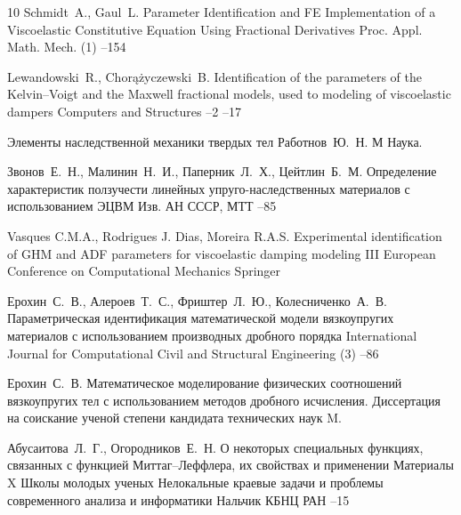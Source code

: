 \begin{thebibliography}{10}
\by Schmidt~A., Gaul~L.
\paper Parameter Identification and FE Implementation of a Viscoelastic Constitutive Equation Using Fractional Derivatives
\jour Proc. Appl. Math. Mech.
(1)
--154

\by Lewandowski~R., \Russian Chor\k{a}\.zyczewski~B.
\paper  Identification of the parameters of the Kelvin--Voigt and the Maxwell fractional models, used to modeling of viscoelastic dampers
\jour Computers and Structures
--2
--17

\book Элементы наследственной механики твердых тел
\by Работнов~Ю.~Н.
\publaddr М
\publ Наука.


\by Звонов~Е.~Н., Малинин~Н.~И., Паперник~Л.~Х., Цейтлин~Б.~М.
\paper Определение характеристик ползучести линейных упруго-наследственных материалов с использованием ЭЦВМ
\jour  Изв. АН СССР, МТТ
–85

\by Vasques C.M.A., Rodrigues J. Dias,  Moreira R.A.S.
\paper Experimental identification of GHM and ADF parameters for viscoelastic damping modeling
\inbook III European Conference on Computational Mechanics
\publ  Springer

\by Ерохин~С.~В., Алероев~Т.~С., Фриштер~Л.~Ю., Колесниченко~А.~В.
\paper Параметрическая идентификация математической модели вязкоупругих
материалов с использованием производных дробного порядка
\jour International Journal for Computational Civil and Structural Engineering
(3)
--86

\by Ерохин~С.~В.
\book Математическое моделирование физических соотношений вязкоупругих тел с использованием методов дробного исчисления. Диссертация на соискание ученой степени кандидата технических наук
\publaddr M.




\by Абусаитова~Л.~Г., Огородников~Е.~Н.
\paper О некоторых специальных функциях, связанных с функцией Миттаг--Леффлера, их свойствах и применении
\bookinfo Материалы X Школы молодых ученых
\inbook Нелокальные краевые задачи и проблемы современного анализа и информатики
\publaddr Нальчик
\publ  КБНЦ РАН
--15


\end{thebibliography}
